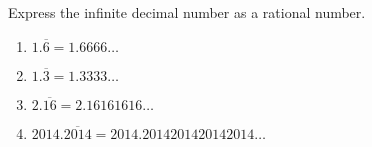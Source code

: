 Express the infinite decimal number as a rational number.
\begin{multicols}{2}
\begin{enumerate}
\item $1.\overline{6}=1.6666\dots$

\item $1.\overline{3}=1.3333\dots$

\item $2.\overline{16}=2.16161616\dots$

\item $2014.\overline{2014}=2014.2014201420142014\dots$

\end{enumerate}
\end{multicols}